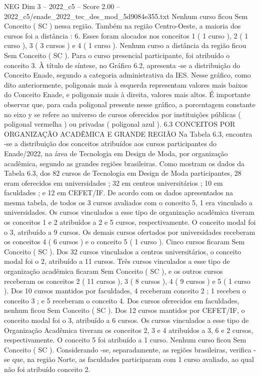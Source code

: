 \begin{textsample}{NEG Dim 3 – 2022\_c5 – Score 2.00 – 2022\_c5/enade\_2022\_tec\_des\_mod\_5d9084e355.txt}
Nenhum curso ficou Sem Conceito ( SC ) nessa região.
Também na região Centro-Oeste, a maioria dos cursos foi a distância : 6.
Esses foram alocados nos conceitos 1 ( 1 curso ), 2 ( 1 curso ), 3 ( 3 cursos ) e 4 ( 1 curso ).
Nenhum curso a distância da região ficou Sem Conceito ( SC ).
Para o curso presencial participante, foi atribuído o conceito 3.
À título de síntese, no Gráfico 6.2, apresenta -se a distribuição do Conceito Enade, segundo a categoria administrativa da IES.
Nesse gráfico, como dito anteriormente, poligonais mais à esquerda representam valores mais baixos do Conceito Enade, e poligonais mais à direita, valores mais altos.
É importante observar que, para cada poligonal presente nesse gráfico, a porcentagem constante no eixo y se refere ao universo de cursos oferecidos por instituições públicas ( poligonal vermelha ) ou privadas ( poligonal azul ). 6.3 CONCEITOS POR ORGANIZAÇÃO ACADÊMICA E GRANDE REGIÃO Na Tabela 6.3, encontra -se a distribuição dos conceitos atribuídos aos cursos participantes do Enade/2022, na área de Tecnologia em Design de Moda, por organização acadêmica, segundo as grandes regiões brasileiras.
Como mostram os dados da Tabela 6.3, dos 82 cursos de Tecnologia em Design de Moda participantes, 28 eram oferecidos em universidades ; 32 em centros universitários ; 10 em faculdades ; e 12 em CEFET/IF.
De acordo com os dados apresentados na mesma tabela, de todos os 3 cursos avaliados com o conceito 5, 1 era vinculado a universidades.
Os cursos vinculados a esse tipo de organização acadêmica tiveram os conceitos 1 e 2 atribuídos a 2 e 5 cursos, respectivamente.
O conceito modal foi o 3, atribuído a 9 cursos.
Os demais cursos ofertados por universidades receberam os conceitos 4 ( 6 cursos ) e o conceito 5 ( 1 curso ).
Cinco cursos ficaram Sem Conceito ( SC ).
Dos 32 cursos vinculados a centros universitários, o conceito modal foi o 2, atribuído a 11 cursos.
Três cursos vinculados a esse tipo de organização acadêmica ficaram Sem Conceito ( SC ), e os outros cursos receberam os conceitos 2 ( 11 cursos ), 3 ( 8 cursos ), 4 ( 9 cursos ) e 5 ( 1 curso ).
Dos 10 cursos mantidos por faculdades, 4 receberam conceito 2 ; 1 recebeu o conceito 3 ; e 5 receberam o conceito 4.
Dos cursos oferecidos em faculdades, nenhum ficou Sem Conceito ( SC ).
Dos 12 cursos mantidos por CEFET/IF, o conceito modal foi o 3, atribuído a 6 cursos.
Os cursos vinculados a esse tipo de Organização Acadêmica tiveram os conceitos 2, 3 e 4 atribuídos a 3, 6 e 2 cursos, respectivamente.
O conceito 5 foi atribuído a 1 curso.
Nenhum curso ficou Sem Conceito ( SC ).
Considerando -se, separadamente, as regiões brasileiras, verifica -se que, na região Norte, as faculdades participaram com 1 curso avaliado, ao qual não foi atribuído conceito 2.

\end{textsample}
